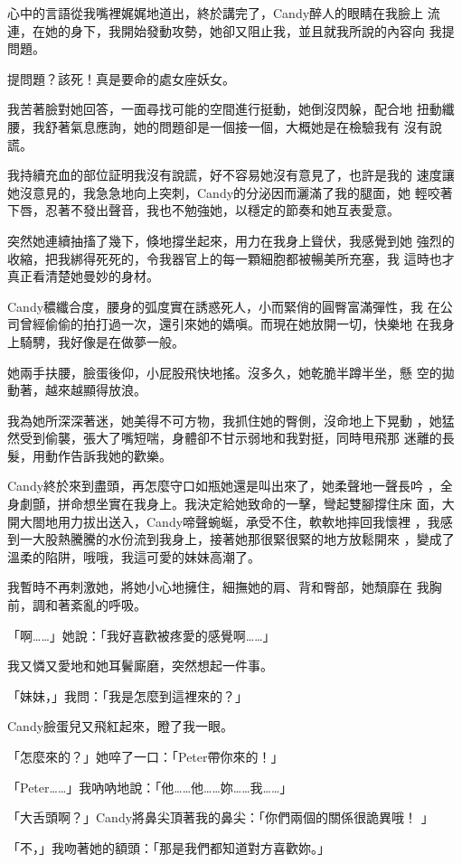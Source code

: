 心中的言語從我嘴裡娓娓地道出，終於講完了，Candy醉人的眼睛在我臉上
流連，在她的身下，我開始發動攻勢，她卻又阻止我，並且就我所說的內容向
我提問題。

提問題？該死！真是要命的處女座妖女。

我苦著臉對她回答，一面尋找可能的空間進行挺動，她倒沒閃躲，配合地
扭動纖腰，我舒著氣息應詢，她的問題卻是一個接一個，大概她是在檢驗我有
沒有說謊。

我持續充血的部位証明我沒有說謊，好不容易她沒有意見了，也許是我的
速度讓她沒意見的，我急急地向上突刺，Candy的分泌因而灑滿了我的腿面，她
輕咬著下唇，忍著不發出聲音，我也不勉強她，以穩定的節奏和她互表愛意。

突然她連續抽搐了幾下，倏地撐坐起來，用力在我身上聳伏，我感覺到她
強烈的收縮，把我綁得死死的，令我器官上的每一顆細胞都被暢美所充塞，我
這時也才真正看清楚她曼妙的身材。

Candy穠纖合度，腰身的弧度實在誘惑死人，小而緊俏的圓臀富滿彈性，我
在公司曾經偷偷的拍打過一次，還引來她的嬌嗔。而現在她放開一切，快樂地
在我身上騎騁，我好像是在做夢一般。

她兩手扶腰，臉蛋後仰，小屁股飛快地搖。沒多久，她乾脆半蹲半坐，懸
空的拋動著，越來越顯得放浪。

我為她所深深著迷，她美得不可方物，我抓住她的臀側，沒命地上下晃動
，她猛然受到偷襲，張大了嘴短喘，身體卻不甘示弱地和我對挺，同時甩飛那
迷離的長髮，用動作告訴我她的歡樂。

Candy終於來到盡頭，再怎麼守口如瓶她還是叫出來了，她柔聲地一聲長吟
，全身劇顫，拼命想坐實在我身上。我決定給她致命的一擊，彎起雙腳撐住床
面，大開大閤地用力拔出送入，Candy啼聲蜿蜒，承受不住，軟軟地摔回我懷裡
，我感到一大股熱騰騰的水份流到我身上，接著她那很緊很緊的地方放鬆開來
，變成了溫柔的陷阱，哦哦，我這可愛的妹妹高潮了。

我暫時不再刺激她，將她小心地擁住，細撫她的肩、背和臀部，她頹靡在
我胸前，調和著紊亂的呼吸。

「啊……」她說：「我好喜歡被疼愛的感覺啊……」

我又憐又愛地和她耳鬢廝磨，突然想起一件事。

「妹妹，」我問：「我是怎麼到這裡來的？」

Candy臉蛋兒又飛紅起來，瞪了我一眼。

「怎麼來的？」她啐了一口：「Peter帶你來的！」

「Peter……」我吶吶地說：「他……他……妳……我……」

「大舌頭啊？」Candy將鼻尖頂著我的鼻尖：「你們兩個的關係很詭異哦！
」

「不，」我吻著她的額頭：「那是我們都知道對方喜歡妳。」

